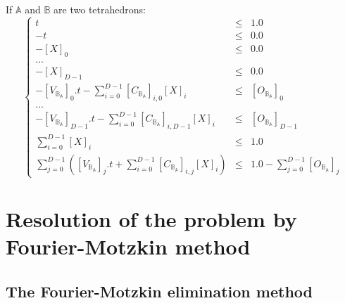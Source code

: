 \documentclass[12pt, a4paper]{article}
\begin{document}
If $\mathbb{A}$ and $\mathbb{B}$ are two tetrahedrons:
\begin{equation}
\left\lbrace
\begin{array}{rcl}
t&\le&1.0\\
-t&\le&0.0\\
-\left[X\right]_0&\le&0.0\\
...\\
-\left[X\right]_{D-1}&\le&0.0\\
-\left[V_{\mathbb{B}_\mathbb{A}}\right]_0.t-\sum_{i=0}^{D-1}\left[C_{\mathbb{B}_\mathbb{A}}\right]_{i,0}\left[X\right]_i&\le&\left[O_{\mathbb{B}_\mathbb{A}}\right]_{0}\\
...\\
-\left[V_{\mathbb{B}_\mathbb{A}}\right]_{D-1}.t-\sum_{i=0}^{D-1}\left[C_{\mathbb{B}_\mathbb{A}}\right]_{i,D-1}\left[X\right]_i&\le&\left[O_{\mathbb{B}_\mathbb{A}}\right]_{D-1}\\
\sum_{i=0}^{D-1}\left[X\right]_i&\le&1.0\\
\sum_{j=0}^{D-1}\left(\left[V_{\mathbb{B}_\mathbb{A}}\right]_j.t+\sum_{i=0}^{D-1}\left[C_{\mathbb{B}_\mathbb{A}}\right]_{i,j}\left[X\right]_i\right)&\le&1.0-\sum_{j=0}^{D-1}\left[O_{\mathbb{B}_\mathbb{A}}\right]_{j}
\end{array}
\right.
\end{equation}

\section{Resolution of the problem by Fourier-Motzkin method}

\subsection{The Fourier-Motzkin elimination method}
\end{document}

